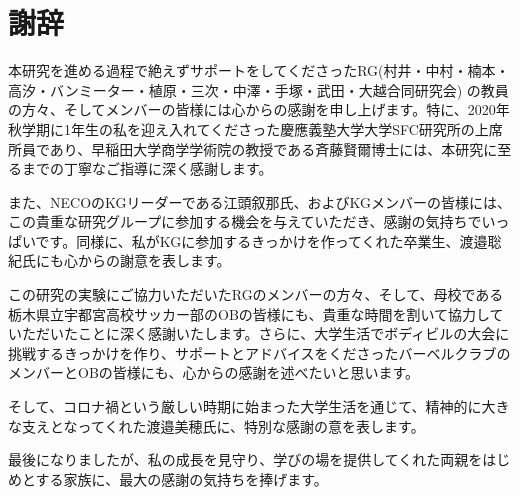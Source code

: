 \chapter*{謝辞}
\label{thanks}

本研究を進める過程で絶えずサポートをしてくださったRG(村井・中村・楠本・高汐・バンミーター・植原・三次・中澤・手塚・武田・大越合同研究会) の教員の方々、そしてメンバーの皆様には心からの感謝を申し上げます。特に、2020年秋学期に1年生の私を迎え入れてくださった慶應義塾大学大学SFC研究所の上席所員であり、早稲田大学商学学術院の教授である斉藤賢爾博士には、本研究に至るまでの丁寧なご指導に深く感謝します。

また、NECOのKGリーダーである江頭叙那氏、およびKGメンバーの皆様には、この貴重な研究グループに参加する機会を与えていただき、感謝の気持ちでいっぱいです。同様に、私がKGに参加するきっかけを作ってくれた卒業生、渡邉聡紀氏にも心からの謝意を表します。

この研究の実験にご協力いただいたRGのメンバーの方々、そして、母校である栃木県立宇都宮高校サッカー部のOBの皆様にも、貴重な時間を割いて協力していただいたことに深く感謝いたします。さらに、大学生活でボディビルの大会に挑戦するきっかけを作り、サポートとアドバイスをくださったバーベルクラブのメンバーとOBの皆様にも、心からの感謝を述べたいと思います。

そして、コロナ禍という厳しい時期に始まった大学生活を通じて、精神的に大きな支えとなってくれた渡邉美穂氏に、特別な感謝の意を表します。

最後になりましたが、私の成長を見守り、学びの場を提供してくれた両親をはじめとする家族に、最大の感謝の気持ちを捧げます。



